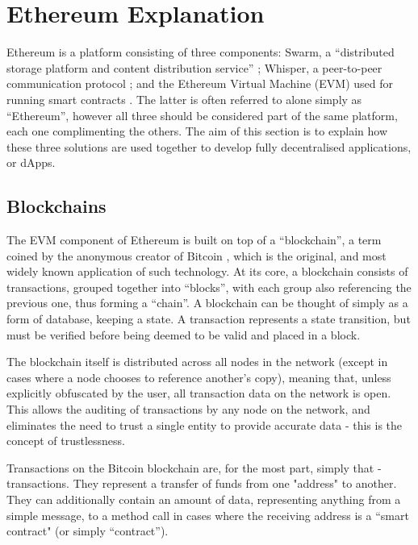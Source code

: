 \section{Ethereum Explanation}

Ethereum is a platform consisting of three components: Swarm, a “distributed storage platform and content distribution service” \cite{Swarm}; Whisper, a peer-to-peer communication protocol \cite{Whisper}; and the Ethereum Virtual Machine (EVM) used for running smart contracts \cite{Ethereum}. The latter is often referred to alone simply as “Ethereum”, however all three should be considered part of the same platform, each one complimenting the others. The aim of this section is to explain how these three solutions are used together to develop fully decentralised applications, or dApps.

\subsection{Blockchains}

The EVM component of Ethereum is built on top of a “blockchain”, a term coined by the anonymous creator of Bitcoin \cite{Bitcoin}, which is the original, and most widely known application of such technology. At its core, a blockchain consists of transactions, grouped together into “blocks”, with each group also referencing the previous one, thus forming a “chain”. A blockchain can be thought of simply as a form of database, keeping a state. A transaction represents a state transition, but must be verified before being deemed to be valid and placed in a block.


The blockchain itself is distributed across all nodes in the network (except in cases where a node chooses to reference another’s copy), meaning that, unless explicitly obfuscated by the user, all transaction data on the network is open. This allows the auditing of transactions by any node on the network, and eliminates the need to trust a single entity to provide accurate data - this is the concept of trustlessness.

Transactions on the Bitcoin blockchain are, for the most part, simply that - transactions. They represent a transfer of funds from one "address" to another. They can additionally contain an amount of data, representing anything from a simple message, to a method call in cases where the receiving address is a “smart contract" (or simply “contract”).

